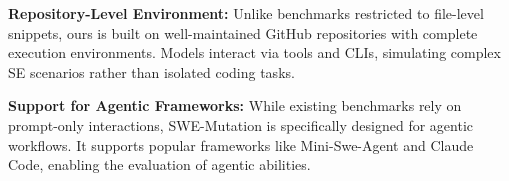 \documentclass[11pt]{article}
\begin{document}
\newcommand{\cmark}{\ding{51}}%
\newcommand{\xmark}{\ding{55}}%

\begin{table}[t]
  \centering
  \caption{
Comparison of SWE-Mutation with state-of-the-art benchmarks. 
  SWE-Mutation distinguishes itself to integrate agentic mutation within a repository-level environment across 10 languages, addressing the limitations of static generation and monolingual focus in prior works.
  }
  \label{tab:characteristics}
  
\end{table}

\textbf{Repository-Level Environment:} Unlike benchmarks restricted to file-level snippets, ours is built on well-maintained GitHub repositories with complete execution environments. Models interact via tools and CLIs, simulating complex SE scenarios rather than isolated coding tasks.

\textbf{Support for Agentic Frameworks:} While existing benchmarks rely on prompt-only interactions, SWE-Mutation is specifically designed for agentic workflows. It supports popular frameworks like Mini-Swe-Agent and Claude Code, enabling the evaluation of agentic abilities.
\end{document}

